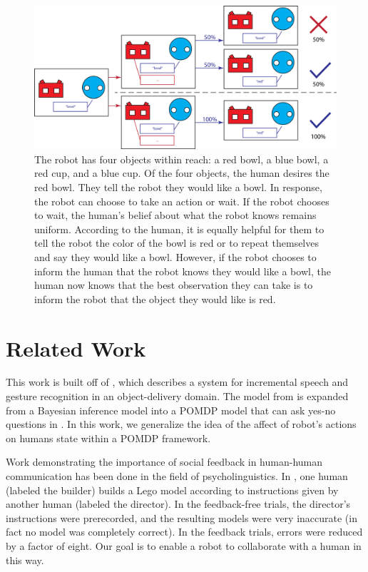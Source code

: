\documentclass[conference]{IEEEtran}
\begin{document}
\begin{figure}
	\begin{center}
		\includegraphics[scale=0.5]{resources/diagram}
		\caption{
The robot has four objects within reach: a red bowl, a blue bowl, a red cup, and a blue cup. Of the four objects, the human desires the red bowl. They tell the robot they would like a bowl. In response, the robot can choose to take an action or wait. 
If the robot chooses to wait, the human's belief about what the robot knows remains uniform. According to the human, it is equally helpful for them to tell the robot the color of the bowl is red or to repeat themselves and say they would like a bowl.  
However, if the robot chooses to inform the human that the robot knows they would like a bowl, the human now knows that the best observation they can take is to inform the robot that the object they would like is red. }
		\label{example}
	\end{center}
\end{figure}

\section{Related Work}

This work is built off of \citet{whitney16}, which describes a system for incremental speech and gesture recognition in an object-delivery domain. The model from \citet{whitney16} is expanded from a Bayesian inference model into a POMDP model that can ask yes-no questions in \citet{socialfeedback}. In this work, we generalize the idea of the affect of robot's actions on humans state within a POMDP framework. 

Work demonstrating the importance of social feedback in human-human
communication has been done in the field of psycholinguistics. In  \citet{clark04}, one human (labeled the builder)
builds a Lego model according to instructions given by another human
(labeled the director). In the feedback-free trials, the director's
instructions were prerecorded, and the resulting models were very
inaccurate (in fact no model was completely correct). In the feedback
trials, errors were reduced by a factor of eight. Our goal is to
enable a robot to collaborate with a human in this way.
\end{document}

